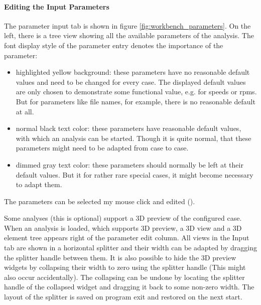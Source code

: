 \paragraph{Editing the Input Parameters}
The parameter input tab is shown in figure \ref{fig:workbench_parameters}. On the left, there is a tree view showing all the available parameters of the analysis.
The font display style of the parameter entry denotes the importance of the parameter:
\begin{itemize}

\item highlighted yellow background: these parameters have no reasonable default values and need to be changed for every case. The displayed default values are only chosen to demonstrate some functional value, e.g. for speeds or rpms. But for parameters like file names, for  example, there is no reasonable default at all.

\item normal black text color: these parameters have reasonable default values, with which an analysis can be started. Though it is quite normal, that these parameters might need to be adapted from case to case.

\item dimmed gray text color: these parameters should normally be left at their default values. But it for rather rare special cases, it might become necessary to adapt them.
\end{itemize}

The parameters can be selected my mouse click and edited ().

Some analyses (this is optional) support a 3D preview of the configured case.
When an analysis is loaded, which supports 3D preview, a 3D view and a 3D element tree appears right of the parameter edit column.
All views in the Input tab are shown in a horizontal splitter and their width can be adapted by dragging the splitter handle between them. It is also possible to hide the 3D preview widgets by collapsing their width to zero using the splitter handle (This might also occur accidentally). The collapsing can be undone by locating the splitter handle of the collapsed widget and dragging it back to some non-zero width.
The layout of the splitter is saved on program exit and restored on the next start.


